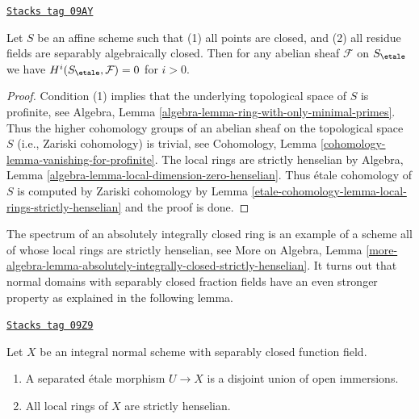 \begin{lemma}
\label{etale-cohomology-lemma-affine-only-closed-points}
\href{https://stacks.math.columbia.edu/tag/09AY}{\texttt{Stacks tag 09AY}}

Let $S$ be an affine scheme such that
(1) all points are closed, and (2) all residue fields are separably
algebraically closed. Then
for any abelian sheaf $\mathcal{F}$ on $S_\etale$ we have
$H^i(S_\etale, \mathcal{F}) = 0$ for $i > 0$.
\end{lemma}

\begin{proof}
Condition (1) implies that the underlying topological space
of $S$ is profinite, see
Algebra, Lemma \ref{algebra-lemma-ring-with-only-minimal-primes}.
Thus the higher cohomology groups of an abelian sheaf on the topological
space $S$ (i.e., Zariski cohomology) is trivial, see
Cohomology, Lemma \ref{cohomology-lemma-vanishing-for-profinite}.
The local rings are strictly henselian by
Algebra, Lemma \ref{algebra-lemma-local-dimension-zero-henselian}.
Thus \'etale cohomology of $S$ is computed by Zariski cohomology
by Lemma \ref{etale-cohomology-lemma-local-rings-strictly-henselian}
and the proof is done.
\end{proof}

The spectrum of an absolutely integrally closed ring
is an example of a scheme all of whose local rings are
strictly henselian, see More on Algebra, Lemma
\ref{more-algebra-lemma-absolutely-integrally-closed-strictly-henselian}.
It turns out that normal domains with separably closed fraction
fields have an even stronger property as explained in the
following lemma.

\begin{lemma}
\label{etale-cohomology-lemma-normal-scheme-with-alg-closed-function-field}
\href{https://stacks.math.columbia.edu/tag/09Z9}{\texttt{Stacks tag 09Z9}}

Let $X$ be an integral normal scheme with separably closed
function field.
\begin{enumerate}
\item A separated \'etale morphism $U \to X$ is a
disjoint union of open immersions.
\item All local rings of $X$ are strictly henselian.
\end{enumerate}
\end{lemma}

